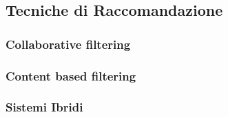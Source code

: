 \subsection{Tecniche di
Raccomandazione}\label{tecniche-di-raccomandazione}

\subsubsection{Collaborative filtering}\label{collaborative-filtering}

\subsubsection{Content based filtering}\label{content-based-filtering}

\subsubsection{Sistemi Ibridi}\label{sistemi-ibridi}
